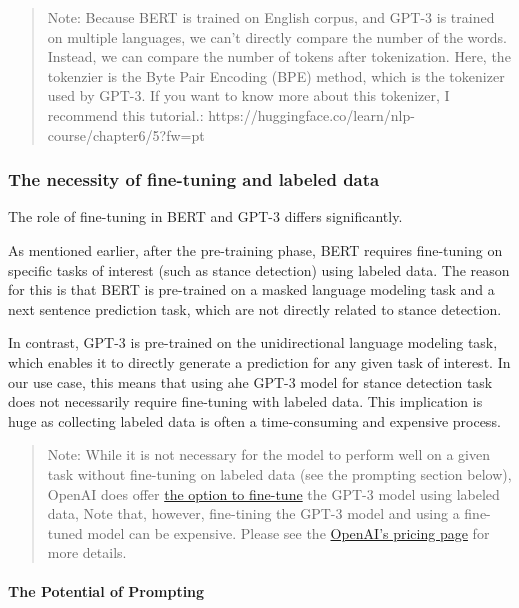 \documentclass[11pt]{article}
\begin{document}
    \begin{quote}
Note: Because BERT is trained on English corpus, and GPT-3 is trained on
multiple languages, we can't directly compare the number of the words.
Instead, we can compare the number of tokens after tokenization. Here,
the tokenzier is the Byte Pair Encoding (BPE) method, which is the
tokenizer used by GPT-3. If you want to know more about this tokenizer,
I recommend this tutorial.:
https://huggingface.co/learn/nlp-course/chapter6/5?fw=pt
\end{quote}

    \hypertarget{the-necessity-of-fine-tuning-and-labeled-data}{%
\subsubsection{The necessity of fine-tuning and labeled
data}\label{the-necessity-of-fine-tuning-and-labeled-data}}

The role of fine-tuning in BERT and GPT-3 differs significantly.

As mentioned earlier, after the pre-training phase, BERT requires
fine-tuning on specific tasks of interest (such as stance detection)
using labeled data. The reason for this is that BERT is pre-trained on a
masked language modeling task and a next sentence prediction task, which
are not directly related to stance detection.

In contrast, GPT-3 is pre-trained on the unidirectional language
modeling task, which enables it to directly generate a prediction for
any given task of interest. In our use case, this means that using ahe
GPT-3 model for stance detection task does not necessarily require
fine-tuning with labeled data. This implication is huge as collecting
labeled data is often a time-consuming and expensive process.

    \begin{quote}
Note: While it is not necessary for the model to perform well on a given
task without fine-tuning on labeled data (see the prompting section
below), OpenAI does offer
\href{https://platform.openai.com/docs/guides/fine-tuning}{the option to
fine-tune} the GPT-3 model using labeled data, Note that, however,
fine-tining the GPT-3 model and using a fine-tuned model can be
expensive. Please see the \href{https://openai.com/pricing}{OpenAI's
pricing page} for more details.
\end{quote}

    \hypertarget{the-potential-of-prompting}{%
\paragraph{The Potential of
Prompting}\label{the-potential-of-prompting}}
\end{document}
